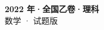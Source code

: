 \documentclass[zihao=-4, a4paper]{ctexart}
\begin{document}
\begin{center}
  {\Large\bfseries 2022 年·全国乙卷·理科}\\[4pt]
  {\large 数学 · 试题版}
\end{center}
\medskip
{}

\end{document}
